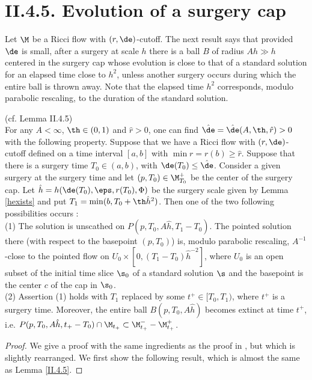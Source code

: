 \section{II.4.5. Evolution of a surgery cap}
\label{secII.4.5}

Let $\M$ be a Ricci flow with $(r,\de)$-cutoff.
The next result says that provided $\de$ is small,
after a surgery at scale $h$
there is a ball $B$  of radius $Ah\gg h$ centered in the
surgery cap whose evolution is close to that
of a standard solution for an elapsed time close to $h^2$,
unless another surgery occurs  during which
the entire ball is thrown away.   Note that the elapsed time $h^2$
corresponds, modulo parabolic rescaling, to the duration
of the standard solution.

\begin{lemma}
  \label{lem:kl-evolution-surgery-cap-existence-standard-solutions}
(cf. Lemma II.4.5)
\label{II.4.5}\\
For any $A<\infty$, $\th\in (0,1)$ and $\hat r>0$,
one can find $\hat\de=\hat\de(A,\th,\hat r)>0$
with the following property.  Suppose that we
have a Ricci flow with $(r, \de)$-cutoff
defined on a time interval $[a,b]$ with  $\min r=r(b)\geq \hat r$.
Suppose that there is a surgery time
$T_0\in (a,b)$, with $\de(T_0)\leq \hat\de$. Consider a given
surgery at the surgery time and let
$(p,T_0)\in\M_{T_0}^+$
be the center of the surgery cap.
Let $\hat h= h(\de(T_0),\eps,r(T_0),\Phi)$ be the surgery
scale given by Lemma \ref{hexists} and put
$T_1=\min(b,T_0+\th \hat h^2)$.
Then one of the two following possibilities occurs : \\
(1) The solution is unscathed on $P(p,T_0,A\hat h,T_1-T_0)$.
The pointed solution there (with respect to the basepoint
$(p, T_0)$) is, modulo parabolic
rescaling, $A^{-1}$-close to the pointed flow on
$U_0\times [0,(T_1-T_0)\hat h^{-2}]$, where
$U_0$ is an open subset of the initial time slice $\s_0$
of a standard solution
$\s$ and the basepoint is
the center $c$ of the cap in $\s_0$. \\
(2) Assertion (1) holds with $T_1$ replaced by some
$t^+ \in [T_0, T_1)$, where $t^+$ is a surgery time. Moreover,
the entire
ball $B(p,T_0,A\hat h)$ becomes extinct at time $t^+$,
i.e.
$P(p,T_0,A\hat h,t_+-T_0)\cap \M_{t_+}\subset \M_{t_+}^- - \M_{t_+}^+$.
\end{lemma}
\begin{proof}
We give a proof with the same ingredients as the proof in
\cite{Perelman2}, but which
is slightly rearranged.
We first show the following result, which is almost the same as
Lemma \ref{II.4.5}.
\end{proof}
